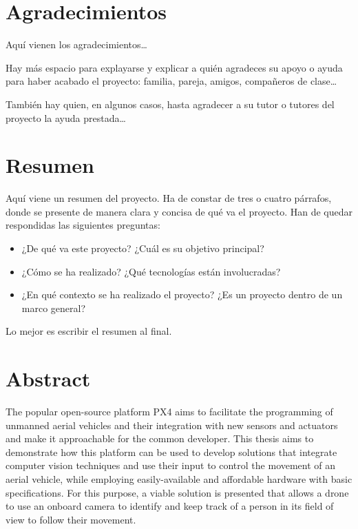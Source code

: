 \documentclass[a4paper, 12pt]{book}
\begin{document}
\chapter*{Agradecimientos}

Aquí vienen los agradecimientos\ldots

Hay más espacio para explayarse y explicar a quién agradeces su apoyo o ayuda para
haber acabado el proyecto: familia, pareja, amigos, compañeros de clase\ldots

También hay quien, en algunos casos, hasta agradecer a su tutor o tutores del proyecto
la ayuda prestada\ldots


\chapter*{Resumen}

Aquí viene un resumen del proyecto.
Ha de constar de tres o cuatro párrafos, donde se presente de manera clara y concisa de qué va el proyecto. 
Han de quedar respondidas las siguientes preguntas:

\begin{itemize}
  \item ¿De qué va este proyecto? ¿Cuál es su objetivo principal?
  \item ¿Cómo se ha realizado? ¿Qué tecnologías están involucradas?
  \item ¿En qué contexto se ha realizado el proyecto? ¿Es un proyecto dentro de un marco general?
\end{itemize}

Lo mejor es escribir el resumen al final.


\chapter*{Abstract}

The popular open-source platform PX4 aims to facilitate the programming of unmanned aerial vehicles and their integration with new sensors and actuators and make it approachable for the common developer. This thesis aims to demonstrate how this platform can be used to develop solutions that integrate computer vision techniques and use their input to control the movement of an aerial vehicle, while employing easily-available and affordable hardware with basic specifications. For this purpose, a viable solution is presented that allows a drone to use an onboard camera to identify and keep track of a person in its field of view to follow their movement.
\end{document}
